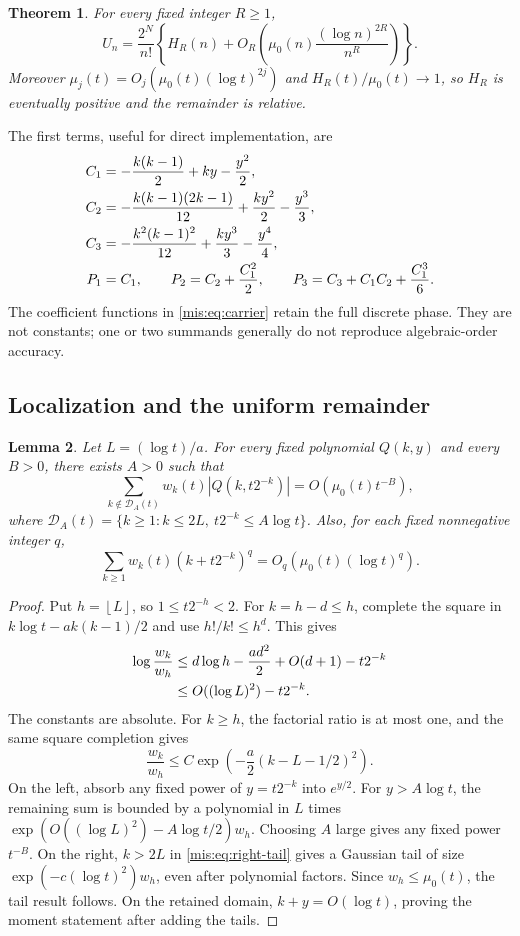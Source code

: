 \documentclass[11pt]{article}
\newtheorem{theorem}{Theorem}[section]
\newtheorem{lemma}[theorem]{Lemma}
\theoremstyle{remark}\newtheorem{remark}[theorem]{Remark}
\newcommand{\floor}[1]{\left\lfloor #1\right\rfloor}
\newcommand{\calD}{\mathcal D}
\begin{document}
\begin{theorem}\label{mis:thm:carrier}
For every fixed integer $R\ge1$,
\begin{equation}\label{mis:eq:all-order}
 U_n=\frac{2^N}{n!}\left\{H_R(n)+
       O_R\left(\mu_0(n)\frac{(\log n)^{2R}}{n^R}\right)\right\}.
\end{equation}
Moreover $\mu_j(t)=O_j(\mu_0(t)(\log t)^{2j})$ and $H_R(t)/\mu_0(t)\to1$, so $H_R$ is eventually positive and the remainder is relative.
\end{theorem}
The first terms, useful for direct implementation, are
\begin{align}
 C_1&=-\frac{k(k-1)}2+ky-\frac{y^2}2,\notag\\
 C_2&=-\frac{k(k-1)(2k-1)}{12}+\frac{ky^2}2-\frac{y^3}3,\notag\\
 C_3&=-\frac{k^2(k-1)^2}{12}+\frac{ky^3}3-\frac{y^4}4,\label{mis:eq:firstCs}\\
 P_1&=C_1,\qquad P_2=C_2+\frac{C_1^2}{2},\qquad
 P_3=C_3+C_1C_2+\frac{C_1^3}{6}.\notag
\end{align}
The coefficient functions in \eqref{mis:eq:carrier} retain the full discrete phase. They are not constants; one or two summands generally do not reproduce algebraic-order accuracy.

\subsection{Localization and the uniform remainder}
\begin{lemma}\label{mis:lem:tails}
Let $L=(\log t)/a$. For every fixed polynomial $Q(k,y)$ and every $B>0$, there exists $A>0$ such that
\[
 \sum_{k\notin\calD_A(t)}w_k(t)|Q(k,t2^{-k})|
       =O(\mu_0(t)t^{-B}),
\]
where $\calD_A(t)=\{k\ge1:k\le2L,\ t2^{-k}\le A\log t\}$. Also, for each fixed nonnegative integer $q$,
\[
 \sum_{k\ge1}w_k(t)(k+t2^{-k})^q
       =O_q(\mu_0(t)(\log t)^q).
\]
\end{lemma}
\begin{proof}
Put $h=\floor L$, so $1\le t2^{-h}<2$. For $k=h-d\le h$, complete the square in $k\log t-ak(k-1)/2$ and use $h!/k!\le h^d$. This gives
\begin{align}
 \log\frac{w_k}{w_h}
 &\le d\log h-\frac{ad^2}{2}+O(d+1)-t2^{-k}\notag\\
 &\le O((\log L)^2)-t2^{-k}.\label{mis:eq:left-tail}
\end{align}
The constants are absolute. For $k\ge h$, the factorial ratio is at most one, and the same square completion gives
\begin{equation}\label{mis:eq:right-tail}
 \frac{w_k}{w_h}\le C\exp\left(-\frac a2(k-L-1/2)^2\right).
\end{equation}
On the left, absorb any fixed power of $y=t2^{-k}$ into $e^{y/2}$. For $y>A\log t$, the remaining sum is bounded by a polynomial in $L$ times
$\exp(O((\log L)^2)-A\log t/2)w_h$. Choosing $A$ large gives any fixed power $t^{-B}$. On the right, $k>2L$ in \eqref{mis:eq:right-tail} gives a Gaussian tail of size $\exp(-c(\log t)^2)w_h$, even after polynomial factors. Since $w_h\le\mu_0(t)$, the tail result follows. On the retained domain, $k+y=O(\log t)$, proving the moment statement after adding the tails.
\end{proof}
\end{document}
